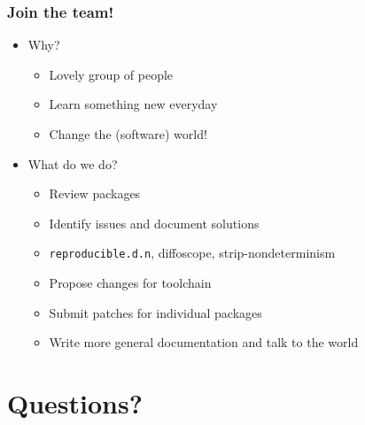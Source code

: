 \documentclass[14pt,aspectratio=169]{beamer}
\begin{document}
\begin{frame}
 \frametitle{Join the team!}

 \begin{itemize}
  \item Why?
   \begin{itemize}
    \item \heartsuit{}\heartsuit{}\heartsuit{} Lovely group of people \heartsuit{}\heartsuit{}\heartsuit{}
    \item Learn something new everyday
    \item Change the (software) world!
   \end{itemize}
  \item What do we do?
   \begin{itemize}
    \item Review packages
    \item Identify issues and document solutions
    \item \texttt{reproducible.d.n}, diffoscope, strip-nondeterminism
    \item Propose changes for toolchain
    \item Submit patches for individual packages
    \item Write more general documentation and  talk to the world
   \end{itemize}
 \end{itemize}
\end{frame}

\section{Questions?}
\end{document}
